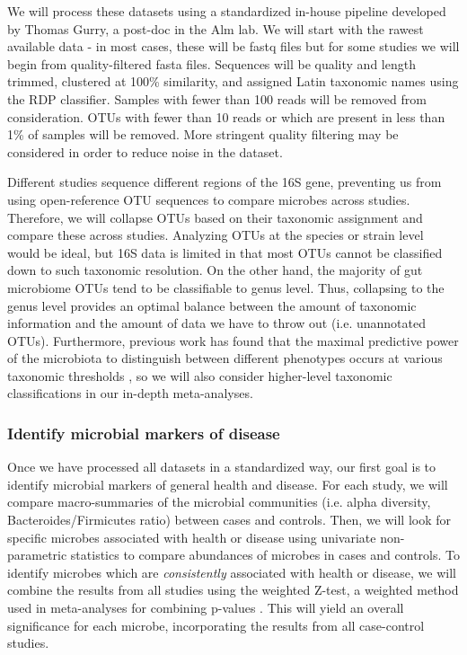 \documentclass[12pt]{article}
\begin{document}
We will process these datasets using a standardized in-house pipeline 
developed by Thomas Gurry, a post-doc in the Alm lab. We will 
start with the rawest available data - in most cases, these will be 
fastq files but for some studies we will begin from quality-filtered 
fasta files. Sequences will be quality and length trimmed, clustered 
at 100\% similarity, and assigned Latin taxonomic names using the RDP 
classifier. Samples with fewer than 100 reads will be removed from 
consideration. OTUs with fewer than 10 reads or which are present in 
less than 1\% of samples will be removed. More stringent quality 
filtering may be considered in order to reduce noise in the dataset.

Different studies sequence different regions of the 16S gene,
preventing us from using open-reference OTU sequences to compare
microbes across studies. Therefore, we will collapse OTUs
based on their taxonomic assignment and compare these across studies.
Analyzing OTUs at the species or strain level would be ideal,
but 16S data is limited in that most OTUs cannot be classified
down to such taxonomic resolution. On the other hand, the majority of gut microbiome
OTUs tend to be classifiable to genus level. Thus, collapsing to the genus level 
provides an optimal balance between the amount of taxonomic information and the 
amount of data we have to throw out (i.e. unannotated OTUs).
Furthermore, previous work has found that the maximal predictive power of the microbiota
to distinguish between different phenotypes
occurs at various taxonomic thresholds \cite{knights-biomarkers-2011}, so we will
also consider higher-level taxonomic classifications in our in-depth meta-analyses.

\subsubsection{Identify microbial markers of disease}\label{sec:indep_studies}
Once we have processed all datasets in a standardized way, our first 
goal is to identify microbial markers of general health and disease. 
For each study, we will compare macro-summaries of the microbial communities
(i.e. alpha diversity, Bacteroides/Firmicutes ratio) between cases and controls.
Then, we will look for specific microbes associated with health or disease using
univariate non-parametric statistics to compare abundances of microbes in cases
and controls. To identify microbes which are \textit{consistently} associated with
health or disease, we will combine the results from all studies using 
the weighted Z-test, a weighted method used in meta-analyses for combining p-values \cite{zavkin-ztest-2011}. 
This will yield an overall significance for each microbe,
incorporating the results from all case-control studies.
\end{document}
